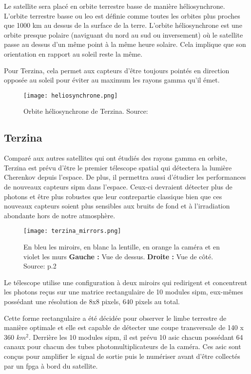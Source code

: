 Le satellite sera placé en orbite terrestre basse de manière héliosynchrone.
L'orbite terrestre basse ou \gls{leo} est définie comme toutes les orbites plus proches que 1000 km au dessus de la surface de la terre.\cite{LowEarthOrbit}
L'orbite héliosynchrone est une orbite presque polaire (naviguant du nord au sud ou inversement) où le satellite 
passe au dessus d'un même point à la même heure solaire. Cela implique que son orientation en rapport au soleil reste la même.

Pour Terzina, cela permet aux capteurs d'être toujours pointés en direction opposée au soleil pour éviter au maximum les rayons gamma qu'il émet.

\begin{figure}[tbph!]
	\centering
	\texttt{[image: heliosynchrone.png]}
	\caption[Orbite héliosynchrone de Terzina]{Orbite héliosynchrone de Terzina. Source: \cite{Nuses}}
\end{figure}

\subsection{Terzina}
Comparé aux autres satellites qui ont étudiés des rayons gamma en orbite, Terzina est prévu d'être le premier télescope spatial
qui détectera la lumière Cherenkov depuis l'espace. De plus, il permettra aussi d'étudier les performances de nouveaux capteurs \gls{sipm}
dans l'espace. Ceux-ci devraient détecter plus de photons et être plus robustes que leur contrepartie classique bien que ces nouveaux capteurs
soient plus sensibles aux bruits de fond et à l'irradiation abondante hors de notre atmosphère.

\begin{figure}[tbph!]
	\centering
	\texttt{[image: terzina\_mirrors.png]}
	\caption[Vue de la configuration optique de Terzina]
	{En bleu les miroirs, en blanc la lentille, en orange la caméra et en violet les murs \textbf{Gauche :} Vue de dessus. \textbf{Droite :} Vue de côté. Source: \cite{Burmistrov_2023} p.2}
\end{figure}

Le télescope utilise une configuration à deux miroirs qui redirigent et concentrent les photons reçus sur une matrice 
rectangulaire de 10 modules \gls{sipm}, eux-mêmes possédant une résolution de 8x8 pixels, 640 pixels au total. \cite{Burmistrov_2023}

Cette forme rectangulaire a été décidée pour observer le limbe terrestre de manière optimale et elle est capable de détecter une coupe transversale de 140 x 360 $km^2$.
Derrière les 10 modules \gls{sipm}, il est prévu 10 \gls{asic} chacun possédant 64 canaux pour chacun des tubes photomultiplicateurs de la caméra.
Ces \gls{asic} sont conçus pour amplifier le signal de sortie puis le numériser avant d'être collectés par un \gls{fpga} à bord du satellite. 

